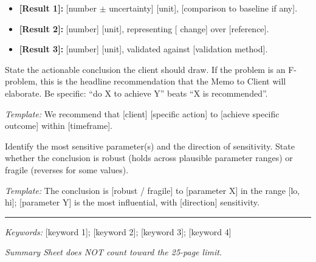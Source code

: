 \begin{description}[leftmargin=0pt, itemindent=0pt, labelsep=0.5em, font=\bfseries]
\begin{itemize}[leftmargin=1.5em, itemsep=0pt]
    \item \textbf{[Result 1]:} [number $\pm$ uncertainty] [unit],
    [comparison to baseline if any].
    \item \textbf{[Result 2]:} [number] [unit], representing [%
    change] over [reference].
    \item \textbf{[Result 3]:} [number] [unit], validated against
    [validation method].
\end{itemize}

\item[Conclusions.]
State the actionable conclusion the client should draw. If the
problem is an F-problem, this is the headline recommendation that
the Memo to Client will elaborate. Be specific: ``do X to achieve
Y'' beats ``X is recommended''.

\textit{Template:} We recommend that [client] [specific action] to
[achieve specific outcome] within [timeframe].

\item[Sensitivity.]
Identify the most sensitive parameter(s) and the direction of
sensitivity. State whether the conclusion is robust (holds across
plausible parameter ranges) or fragile (reverses for some values).

\textit{Template:} The conclusion is [robust / fragile] to
[parameter X] in the range [lo, hi]; [parameter Y] is the most
influential, with [direction] sensitivity.

\end{description}

\vspace{0.3cm}
\rule{\textwidth}{0.5pt}

\begin{center}
\textit{Keywords:} [keyword 1]; [keyword 2]; [keyword 3]; [keyword 4]
\end{center}

\vfill
\begin{flushright}
\textit{Summary Sheet does NOT count toward the 25-page limit.}
\end{flushright}
